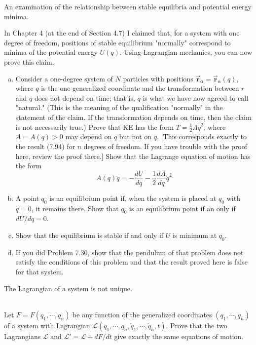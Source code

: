 \documentclass[11pt,letterpaper,boxed]{../hmcpsetrhino}
\newcommand{\half}{\frac{1}{2}}
\let\oldvec\vec
\renewcommand{\vec}[1]{\oldvec{\mathbf{#1}}}
\def\Lagr{\mathcal{L}}
\begin{document}
\begin{problem}[ii]
An examination of the relationship between stable equilibria and potential energy minima.

\begin{problem}[7.47]
In Chapter 4 (at the end of Section 4.7) I claimed that, for a system with one degree of freedom, positions of stable equilibrium "normally" correspond to minima of the potential energy $U(q)$. Using Lagrangian mechanics, you can now prove this claim. 
\begin{enumerate}[(a)]
\item Consider a one-degree system of $N$ particles with positions $\vec{ r}_\alpha = \vec r_\alpha(q)$, where $q$ is the one generalized coordinate and the transformation between $r$ and $q$ does not depend on time; that is, $q$ is what we have now agreed to call "natural." (This is the meaning of the qualification "normally" in the statement of the claim. If the transformation depends on time, then the claim is not necessarily true.) Prove that KE has the form $T = \half A \dot q^2$, where $A = A(q) > 0$ may depend on $q$ but not on $\dot q$. [This corresponds exactly to the result (7.94) for $n$ degrees of freedom. If you have trouble with the proof here, review the proof there.] Show that the Lagrange equation of motion has the form 
\[	A(q) \ddot q = -\frac{d U}{d q} - \half \frac{d A}{d q} \dot q ^2 \]
\item A point $q_0$ is an equilibrium point if, when the system is placed at $q_0$ with $\dot q = 0$, it remains there. Show that $q_0$ is an equilibrium point if an only if $dU/dq = 0$. 
\item Show that the equilibrium is stable if and only if $U$ is minimum at $q_0$. 
\item If you did Problem 7.30, show that the pendulum of that problem does not satisfy the conditions of this problem and that the result proved here is false for that system.
\end{enumerate}
\end{problem}
\end{problem}

\begin{solution}

\vfill
\end{solution}


\newpage

\begin{problem}[iii]
The Lagrangian of a system is not unique.\\
\hfill\\
\begin{problem}[7.48]
Let $F = F(q_1, \cdots , q_n)$ be any function of the generalized coordinates $(q_1, \cdots, q_n)$ of a system with Lagrangian $\Lagr(q_1, \cdots, q_n, \dot q_1, \cdots, \dot q_n, t)$. Prove that the two Lagrangians $\Lagr$ and $\Lagr' = \Lagr+ d F/ dt$ give exactly the same equations of motion.
\end{problem}
\vspace{-0.45cm}
\end{problem}
\end{document}
